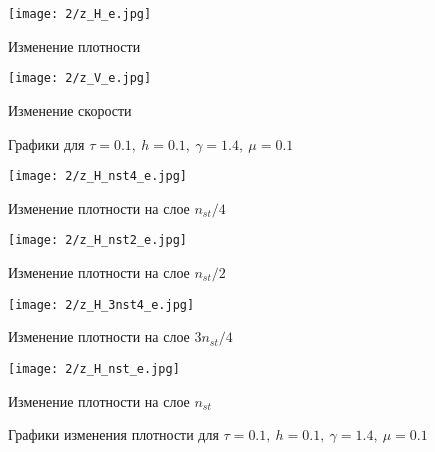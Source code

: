 \begin{figure}[h]
	\centering
	\begin{minipage}[b]{0.49\linewidth}
		\centering
		\texttt{[image: 2/z\_H\_e.jpg]}  %
		\caption{Изменение плотности}
	\end{minipage}%
	\hfill
	\begin{minipage}[b]{0.49\linewidth}
		\centering
		\texttt{[image: 2/z\_V\_e.jpg]}  %
		\caption{Изменение скорости}
	\end{minipage}
	\caption{Графики для $\tau = 0.1, \ h = 0.1, \ \gamma = 1.4, \ \mu = 0.1$}
	\label{ris:images}
\end{figure}

\begin{figure}[h]
	\begin{minipage}[h]{0.47\linewidth}
		\centering
		\texttt{[image: 2/z\_H\_nst4\_e.jpg]} 
		\caption{Изменение плотности на слое $n_{st} / 4$}
	\end{minipage}
	\hfill
	\begin{minipage}[h]{0.47\linewidth}
		\centering
		\texttt{[image: 2/z\_H\_nst2\_e.jpg]} 
		\caption{Изменение плотности на слое $n_{st} / 2$}
	\end{minipage}
	\vfill
	\begin{minipage}[h]{0.47\linewidth}
		\centering
		\texttt{[image: 2/z\_H\_3nst4\_e.jpg]} 
		\caption{Изменение плотности на слое $3n_{st} / 4$}
	\end{minipage}
	\hfill
	\begin{minipage}[h]{0.47\linewidth}
		\centering
		\texttt{[image: 2/z\_H\_nst\_e.jpg]} 
		\caption{Изменение плотности на слое $n_{st}$}
	\end{minipage}
	\caption{Графики изменения плотности для $\tau = 0.1, \ h = 0.1, \ \gamma = 1.4, \ \mu = 0.1$}
	\label{ris:experimentalcorrelationsignals}
\end{figure}

